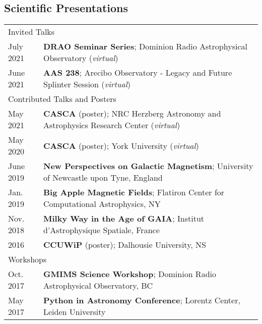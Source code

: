 \documentclass[10pt]{res} %
\begin{document}
\begin{resume}
\section{\Large Scientific Presentations}
\vspace{-5pt} %
\noindent\makebox[\linewidth]{\rule{\textwidth}{0.4pt}}
\vspace{-20pt} %

\begin{table}[h!]
\begin{tabularx}{\textwidth}{lX}
\multicolumn{2}{l}{ \rule{0pt}{3ex} \large \hspace{-12pt} Invited Talks \dotfill \rule[-1.2ex]{0pt}{0pt}} \\
July 2021 & \textbf{DRAO Seminar Series}; Dominion Radio Astrophysical Observatory (\textit{virtual}) \\
June 2021 & \textbf{AAS 238}; Arecibo Observatory - Legacy and Future Splinter Session (\textit{virtual}) \\
\multicolumn{2}{l}{ \rule{0pt}{3ex} \large \hspace{-12pt} Contributed Talks and Posters \dotfill \rule[-1.2ex]{0pt}{0pt}} \\
May 2021 & \textbf{CASCA} (poster); NRC Herzberg Astronomy and Astrophysics Research Center (\textit{virtual}) \\
May 2020 & \textbf{CASCA} (poster); York University (\textit{virtual}) \\
June 2019 & \textbf{New Perspectives on Galactic Magnetism}; University of Newcastle upon Tyne, England \\
Jan. 2019 & \textbf{Big Apple Magnetic Fields}; Flatiron Center for Computational Astrophysics, NY \\
Nov. 2018 & \textbf{Milky Way in the Age of GAIA}; Institut d'Astrophysique Spatiale, France \\
2016 & \textbf{CCUWiP} (poster); Dalhousie University, NS \\
\multicolumn{2}{l}{ \rule{0pt}{3ex} \large \hspace{-12pt} Workshops \dotfill \rule[-1.2ex]{0pt}{0pt}}  \\
Oct. 2017 & \textbf{GMIMS Science Workshop}; Dominion Radio Astrophysical Observatory, BC \\
May 2017 & \textbf{Python in Astronomy Conference}; Lorentz Center, Leiden University 
\end{tabularx}
\end{table}


\end{resume}
\end{document}
